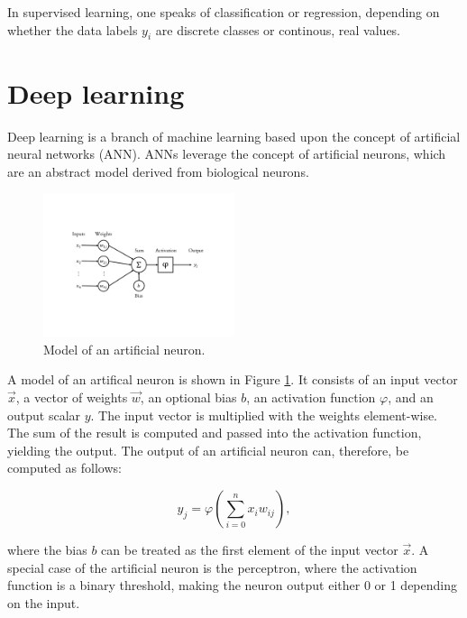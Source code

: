 \documentclass{l4proj}
\begin{document}
In supervised learning, one speaks of classification or regression, depending on whether the data labels $y_i$ are discrete classes or continous, real values.




\section{Deep learning}

Deep learning is a branch of machine learning based upon the concept of artificial neural networks (ANN). ANNs leverage the concept of artificial neurons, which are an abstract model derived from biological neurons. 

\begin{figure}[ht]
  \centering
  \includegraphics[width=0.5\textwidth, page={1}, trim={3.5cm 5cm 3.5cm 5cm}, clip]{images/Artificial_Neuron}
  \caption{Model of an artificial neuron.}
  \label{fig:neuron}
\end{figure}

A model of an artifical neuron is shown in Figure \ref{fig:neuron}. It consists of an input vector $\vec{x}$, a vector of weights $\vec{w}$, an optional bias $b$, an activation function $\varphi$, and an output scalar $y$. The input vector is multiplied with the weights element-wise. The sum of the result is computed and passed into the activation function, yielding the output. The output of an artificial neuron can, therefore, be computed as follows:

\begin{equation}
  y_j = \varphi (\sum_{i=0}^n x_i w_{ij}),
\end{equation}

where the bias $b$ can be treated as the first element of the input vector $\vec{x}$. A special case of the artificial neuron is the perceptron, where the activation function is a binary threshold, making the neuron output either 0 or 1 depending on the input.
\end{document}
